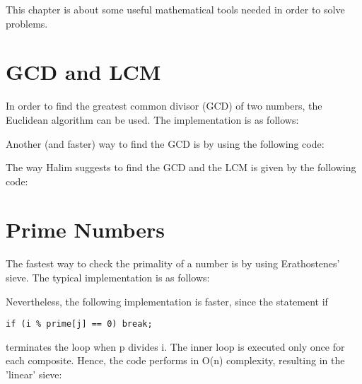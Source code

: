 This chapter is about some useful mathematical tools needed in order to solve problems.

\section{GCD and LCM}

In order to find the greatest common divisor (GCD) of two numbers, the Euclidean algorithm can be used. The implementation is as follows:



Another (and faster) way to find the GCD is by using the following code:



The way Halim suggests to find the GCD and the LCM is given by the following code:



\section{Prime Numbers}

The fastest way to check the primality of a number is by using Erathostenes' sieve. The typical implementation is as follows:



Nevertheless, the following implementation is faster, since  the statement if \begin{verbatim}
if (i % prime[j] == 0) break;
\end{verbatim}
 terminates the loop when p divides i. The inner loop is executed only once for each composite. Hence, the code performs in O(n) complexity, resulting in the 'linear' sieve:




